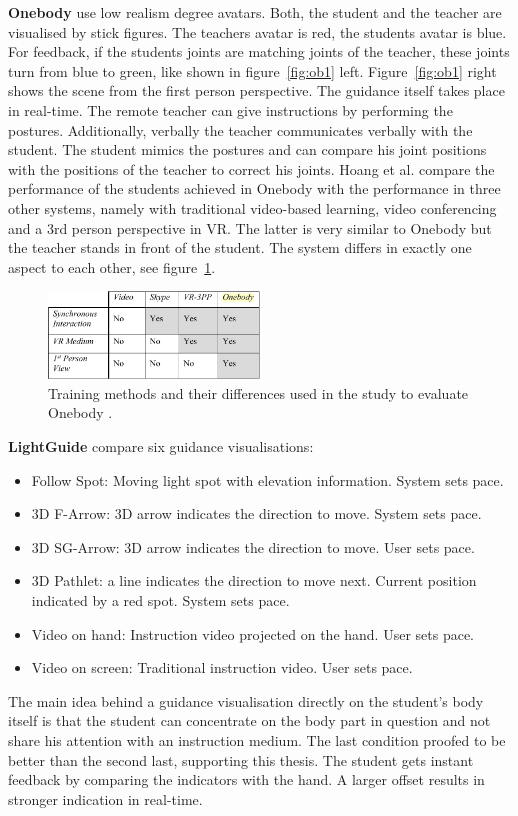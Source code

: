 \textbf{Onebody} \cite{Hoang2016} use low realism degree avatars. Both, the student and the teacher are visualised by stick figures. The teachers avatar is red, the students avatar is blue. For feedback, if the students joints are matching joints of the teacher, these joints turn from blue to green, like shown in figure~\ref{fig:ob1} left. Figure~\ref{fig:ob1} right shows the scene from the first person perspective.
The guidance itself takes place in real-time. The remote teacher can give instructions by performing the postures. Additionally, verbally the teacher communicates verbally with the student. The student mimics the postures and can compare his joint positions with the positions of the teacher to correct his joints. Hoang et al. compare the performance of the students achieved in Onebody with the performance in three other systems, namely with traditional video-based learning, video conferencing and a 3rd person perspective in VR. The latter is very similar to Onebody but the teacher stands in front of the student. The system differs in exactly one aspect to each other, see figure~\ref{fig:ob2}.
\begin{figure}[h!]
	\centering
	\includegraphics[width=0.5\textwidth]{img/onebody_training_methods.PNG}
	\caption{Training methods and their differences used in the study to evaluate Onebody \cite{Hoang2016}.}
	\label{fig:ob2}
\end{figure}
\newpage
\textbf{LightGuide} \cite{Sodhi2012} compare six guidance visualisations:
\begin{itemize}
	\item Follow Spot: Moving light spot with elevation information. System sets pace.
	\item 3D F-Arrow: 3D arrow indicates the direction to move. System sets pace.
	\item 3D SG-Arrow: 3D arrow indicates the direction to move. User sets pace.
	\item 3D Pathlet: a line indicates the direction to move next. Current position indicated by a red spot. System sets pace.
	\item Video on hand: Instruction video projected on the hand. User sets pace.
	\item Video on screen: Traditional instruction video. User sets pace.
\end{itemize}
The main idea behind a guidance visualisation directly on the student's body itself is that the student can concentrate on the body part in question and not share his attention with an instruction medium. The last condition proofed to be better than the second last, supporting this thesis.
The student gets instant feedback by comparing the indicators with the hand. A larger offset results in stronger indication in real-time.\\

